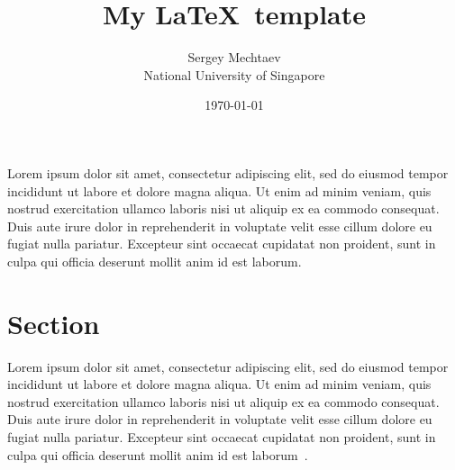 \documentclass[11pt,a4paper]{article}
\begin{document}

\onehalfspacing

\title{ \LARGE {My \LaTeX\ template}}
\author{ {Sergey Mechtaev} \\
 {National University of Singapore}}
\date{ {\today}}
\maketitle

\onehalfspacing


Lorem ipsum dolor sit amet, consectetur adipiscing elit, sed do eiusmod tempor incididunt ut labore et dolore magna aliqua. Ut enim ad minim veniam, quis nostrud exercitation ullamco laboris nisi ut aliquip ex ea commodo consequat. Duis aute irure dolor in reprehenderit in voluptate velit esse cillum dolore eu fugiat nulla pariatur. Excepteur sint occaecat cupidatat non proident, sunt in culpa qui officia deserunt mollit anim id est laborum.

\begin{figure}[h]
  \centering
  \scalebox{1.0}{}
\end{figure}

\section*{Section}

Lorem ipsum dolor sit amet, consectetur adipiscing elit, sed do eiusmod tempor incididunt ut labore et dolore magna aliqua. Ut enim ad minim veniam, quis nostrud exercitation ullamco laboris nisi ut aliquip ex ea commodo consequat. Duis aute irure dolor in reprehenderit in voluptate velit esse cillum dolore eu fugiat nulla pariatur. Excepteur sint occaecat cupidatat non proident, sunt in culpa qui officia deserunt mollit anim id est laborum~\cite{mechtaev2015directfix, mechtaev2016angelix}.

\onehalfspacing


\end{document}
